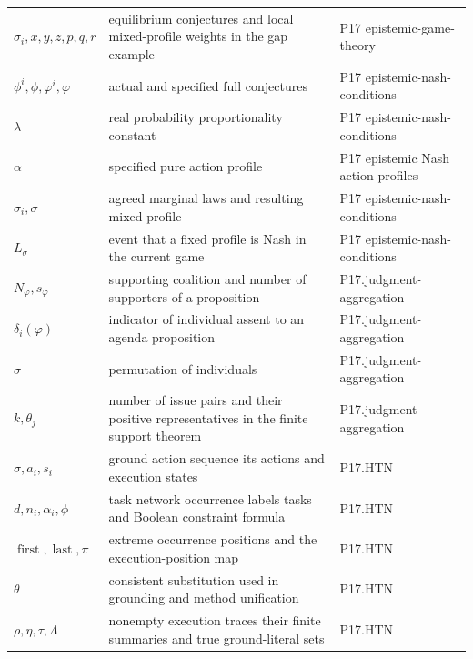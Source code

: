 \begin{longtable}{@{}p{}p{}p{}@{}}
\(\sigma_i,\allowbreak x,\allowbreak y,\allowbreak z,\allowbreak p,\allowbreak q,\allowbreak r\) & equilibrium conjectures and local mixed-profile weights in the gap example & P17 epistemic-\allowbreak{}game-\allowbreak{}theory \\
\(\phi^i,\allowbreak \phi,\allowbreak \varphi^i,\allowbreak \varphi\) & actual and specified full conjectures & P17 epistemic-\allowbreak{}nash-\allowbreak{}conditions \\
\(\lambda\) & real probability proportionality constant & P17 epistemic-\allowbreak{}nash-\allowbreak{}conditions \\
\(\alpha\) & specified pure action profile & P17 epistemic Nash action profiles \\
\(\sigma_i,\allowbreak \sigma\) & agreed marginal laws and resulting mixed profile & P17 epistemic-\allowbreak{}nash-\allowbreak{}conditions \\
\(L_\sigma\) & event that a fixed profile is Nash in the current game & P17 epistemic-\allowbreak{}nash-\allowbreak{}conditions \\
\(N_\varphi,\allowbreak s_\varphi\) & supporting coalition and number of supporters of a proposition & P17.\allowbreak{}judgment-\allowbreak{}aggregation \\
\(\delta_i(\varphi)\) & indicator of individual assent to an agenda proposition & P17.\allowbreak{}judgment-\allowbreak{}aggregation \\
\(\sigma\) & permutation of individuals & P17.\allowbreak{}judgment-\allowbreak{}aggregation \\
\(k,\allowbreak \theta_j\) & number of issue pairs and their positive representatives in the finite support theorem & P17.\allowbreak{}judgment-\allowbreak{}aggregation \\
\(\sigma,\allowbreak a_i,\allowbreak s_i\) & ground action sequence its actions and execution states & P17.\allowbreak{}HTN \\
\(d,\allowbreak n_i,\allowbreak \alpha_i,\allowbreak \phi\) & task network occurrence labels tasks and Boolean constraint formula & P17.\allowbreak{}HTN \\
\(\operatorname{first},\allowbreak \operatorname{last},\allowbreak \pi\) & extreme occurrence positions and the execution-position map & P17.\allowbreak{}HTN \\
\(\theta\) & consistent substitution used in grounding and method unification & P17.\allowbreak{}HTN \\
\(\rho,\allowbreak \eta,\allowbreak \tau,\allowbreak \Lambda\) & nonempty execution traces their finite summaries and true ground-literal sets & P17.\allowbreak{}HTN \\

\end{longtable}
